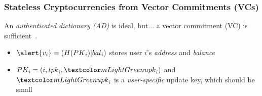 \begin{frame}
    \frametitle{Stateless Cryptocurrencies from Vector Commitments (VCs)}

    \small
    \pause
    An \textit{authenticated dictionary (AD)} is ideal, but...\pause\xspace
    a \alert{vector commitment (VC)} is sufficient~\cite{CPZ18}.\pause\xspace
    \begin{itemize}
        \item $\alert{v_i} = (H(\PK_i)|\bal_i)$ stores user $i$'s \textit{address} and \textit{balance}\pause
        \item $PK_i = (i,\tpk_i, \upk_i)$ and $\upk_i$ is a \textit{user-specific} \alert{update key}, which should be small\pause
    \end{itemize}


\end{frame}
